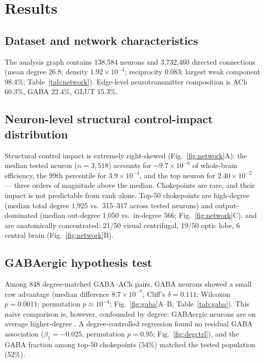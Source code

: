 \section{Results}

\subsection{Dataset and network characteristics}
The analysis graph contains 138,584 neurons and 3,732,460 directed
connections (mean degree 26.8; density $1.92\times10^{-4}$; reciprocity
0.083; largest weak component 98.4\%; Table~\ref{tab:network}). Edge-level
neurotransmitter composition is ACh 60.3\%, GABA 22.4\%, GLUT 15.3\%.

\subsection{Neuron-level structural control-impact distribution}
Structural control impact is extremely right-skewed (Fig.~\ref{fig:network}A):
the median tested neuron ($n=3{,}518$) accounts for
$\sim$$9.7\times10^{-6}$ of whole-brain efficiency, the 99th percentile
for $3.9\times10^{-4}$, and the top neuron for $2.40\times10^{-2}$ ---
three orders of magnitude above the median. Chokepoints are rare, and
their impact is not predictable from rank alone. Top-50 chokepoints are
high-degree (median total degree 1,925 vs.\ 315--317 across tested
neurons) and output-dominated (median out-degree 1,050 vs.\ in-degree
566; Fig.~\ref{fig:network}C), and are anatomically concentrated: 21/50
visual centrifugal, 19/50 optic lobe, 6 central brain
(Fig.~\ref{fig:network}B).

\subsection{GABAergic hypothesis test}
Among 848 degree-matched GABA--ACh pairs, GABA neurons showed a small
raw advantage (median difference $8.7\times10^{-7}$; Cliff's
$\delta=0.111$; Wilcoxon $p=0.0011$; permutation $p\approx10^{-4}$;
Fig.~\ref{fig:gaba}A--B; Table~\ref{tab:gaba}). This naive comparison is,
however, confounded by degree: GABAergic neurons are on average
higher-degree \cite{lin2024}. A degree-controlled regression found no
residual GABA association ($\beta_1=-0.025$, permutation $p=0.95$;
Fig.~\ref{fig:degctrl}), and the GABA fraction among top-50 chokepoints
(54\%) matched the tested population (52\%).

